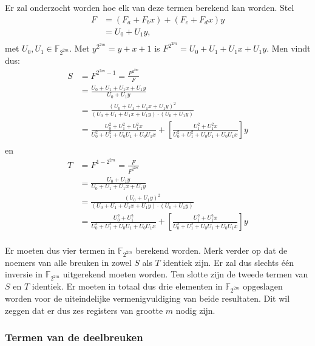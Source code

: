Er zal onderzocht worden hoe elk van deze termen berekend kan worden. Stel
\[\begin{aligned}
F	&= (F_a + F_b x) + (F_c + F_d x)y\\
	&= U_0 + U_1y,\\
\end{aligned}\]
met $U_0, U_1 \in \mathbb{F}_{2^{2m}}$. Met $y^{2^{2m}} = y + x + 1$ is $F^{2^{2m}} = U_0 + U_1 + U_1x + U_1y$. 	Men vindt dus:
\[\begin{aligned}
S  &= F^{2^{2m} - 1} = \frac{F^{2^{2m}}}{F}\\
	&= \frac{U_0 + U_1 + U_1x + U_1y}{U_0 + U_1y}\\
	&= \frac{(U_0 + U_1 + U_1x + U_1y)^2}{(U_0 + U_1 + U_1x + U_1y) \cdot (U_0 + U_1y)}\\
	&= \frac{U_0^2 + U_1^2 + U_1^2x}{U_0^2 + U_1^2 + U_0 U_1 + U_0 U_1 x} + \left[\frac{U_1^2 + U_1^2x}{U_0^2 + U_1^2 + U_0 U_1 + U_0 U_1 x}\right]y\\
\end{aligned}\]
en
\[\begin{aligned}
T  &= F^{1 - 2^{2m}} = \frac{F}{F^{2^{2m}}}\\
	&= \frac{U_0 + U_1y}{U_0 + U_1 + U_1x + U_1y}\\
	&= \frac{(U_0 + U_1y)^2}{(U_0 + U_1 + U_1x + U_1y) \cdot (U_0 + U_1y)}\\
	&= \frac{U_0^2 + U_1^2}{U_0^2 + U_1^2 + U_0 U_1 + U_0 U_1 x} + \left[\frac{U_1^2 + U_1^2x}{U_0^2 + U_1^2 + U_0 U_1 + U_0 U_1 x}\right]y\\
\end{aligned}\]

Er moeten dus vier termen in $\mathbb{F}_{2^{2m}}$ berekend worden. Merk verder op dat de noemers van alle breuken in zowel $S$ als $T$ identiek zijn. Er zal dus slechts \'e\'en inversie in $\mathbb{F}_{2^{2m}}$ uitgerekend moeten worden. Ten slotte zijn de tweede termen van $S$ en $T$ identiek. Er moeten in totaal dus drie elementen in $\mathbb{F}_{2^{2m}}$ opgeslagen worden voor de uiteindelijke vermenigvuldiging van beide resultaten. Dit wil zeggen dat er dus zes registers van grootte $m$ nodig zijn.

\subsubsection{Termen van de deelbreuken}

